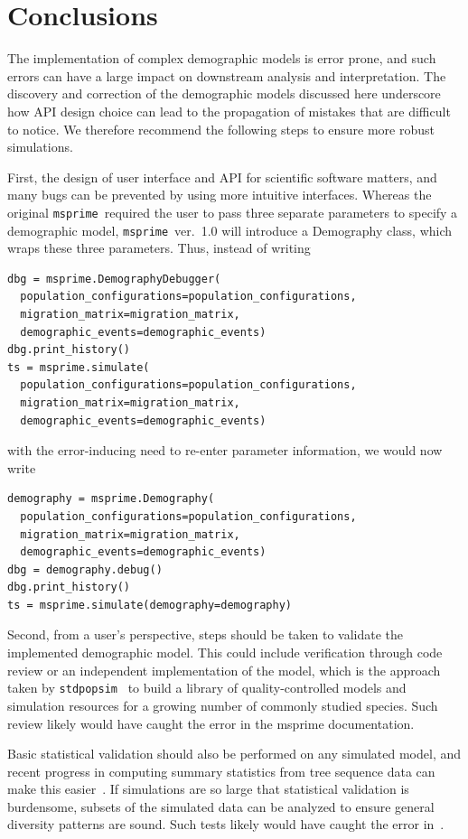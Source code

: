 \documentclass{article}
\newcommand{\msprime}[0]{\texttt{msprime}}
\newcommand{\stdpopsim}[0]{\texttt{stdpopsim}}
\begin{document}
\section*{Conclusions}

The implementation of complex demographic models is error prone, and such errors
can have a large impact on downstream analysis and interpretation. 
The discovery and correction of the demographic models discussed here underscore
how API design choice can lead to the propagation of mistakes that are difficult
to notice. We therefore recommend the following steps to ensure more robust simulations.

First, the design of user interface and API for scientific software matters,
and many bugs can be prevented by using more intuitive interfaces.
Whereas the original \msprime\ required the user to pass
three separate parameters to specify a demographic model, \msprime~ver.~1.0
will introduce a Demography class, which wraps these three parameters.
Thus, instead of writing
\begin{lstlisting}[frame=single]
dbg = msprime.DemographyDebugger(
  population_configurations=population_configurations,
  migration_matrix=migration_matrix,
  demographic_events=demographic_events)
dbg.print_history()
ts = msprime.simulate(
  population_configurations=population_configurations,
  migration_matrix=migration_matrix,
  demographic_events=demographic_events)
\end{lstlisting}
with the error-inducing need to re-enter parameter information,
we would now write
\begin{lstlisting}[frame=single]
demography = msprime.Demography(
  population_configurations=population_configurations,
  migration_matrix=migration_matrix,
  demographic_events=demographic_events)
dbg = demography.debug()
dbg.print_history()
ts = msprime.simulate(demography=demography)
\end{lstlisting}

Second, from a user's perspective, steps should be taken to validate the implemented
demographic model. This could include verification through code review or an
independent implementation of the model, which is the approach taken by
\stdpopsim~\citep{adrion2019community} to build a library of quality-controlled
models and simulation resources for a growing number of commonly studied species. 
Such review likely would have caught the error in the msprime documentation.


Basic statistical validation should also be performed on any simulated model, and
recent progress in computing summary statistics from tree sequence data can make
this easier~\citep{ralph2020efficiently}. If simulations are so large that statistical
validation is burdensome, subsets of the simulated data can be analyzed to ensure
general diversity patterns are sound. Such tests likely would have caught the error
in~\citet{martin2017human}.
\end{document}
